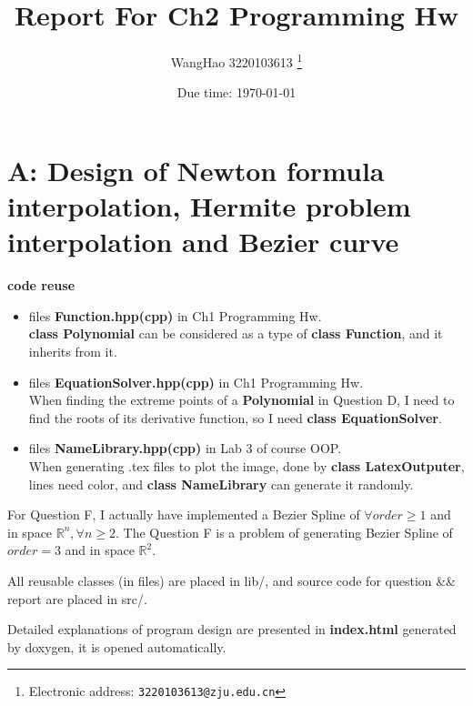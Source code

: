 \documentclass[a4paper]{article}
\begin{document}
\title{Report For Ch2 Programming Hw}

\author{WangHao 3220103613
  \thanks{Electronic address: \texttt{3220103613@zju.edu.cn}}}


\date{Due time: \today}

\maketitle


\section*{A: Design of Newton formula interpolation, Hermite problem interpolation and Bezier curve}

\textbf{\large code reuse}
\begin{itemize}
  \item files \textbf{Function.hpp(cpp)} in Ch1 Programming Hw.\\
  \textbf{class Polynomial} can be considered as a type of \textbf{class Function}, 
  and it inherits from it.
  \item files \textbf{EquationSolver.hpp(cpp)} in Ch1 Programming Hw.\\
  When finding the extreme points of a \textbf{Polynomial} in Question D, 
  I need to find the roots of its derivative function, 
  so I need \textbf{class EquationSolver}.
  \item files \textbf{NameLibrary.hpp(cpp)} in Lab 3 of course OOP. \\
  When generating .tex files to plot the image, done by \textbf{class LatexOutputer}, 
  lines need color, and \textbf{class NameLibrary} can generate it randomly.
\end{itemize}

For Question F, I actually have implemented a Bezier Spline of $\forall order \geq 1$ and in space $\mathbb{R}^n, \forall n \geq 2$.
The Question F is a problem of generating Bezier Spline of $order=3$ and in space $\mathbb{R}^2$.

All reusable classes (in files) are placed in lib/, and source code for question \&\& report are placed in src/.

Detailed explanations of program design are presented in \textbf{index.html} generated by doxygen, it is opened automatically.
\end{document}
